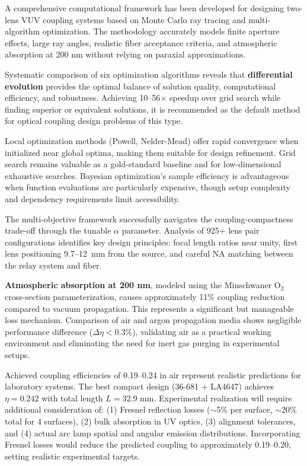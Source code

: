 A comprehensive computational framework has been developed for designing two-lens VUV coupling systems based on Monte Carlo ray tracing and multi-algorithm optimization. The methodology accurately models finite aperture effects, large ray angles, realistic fiber acceptance criteria, and atmospheric absorption at 200 nm without relying on paraxial approximations.

Systematic comparison of six optimization algorithms reveals that \textbf{differential evolution} provides the optimal balance of solution quality, computational efficiency, and robustness. Achieving 10--56$\times$ speedup over grid search while finding superior or equivalent solutions, it is recommended as the default method for optical coupling design problems of this type.

Local optimization methods (Powell, Nelder-Mead) offer rapid convergence when initialized near global optima, making them suitable for design refinement. Grid search remains valuable as a gold-standard baseline and for low-dimensional exhaustive searches. Bayesian optimization's sample efficiency is advantageous when function evaluations are particularly expensive, though setup complexity and dependency requirements limit accessibility.

The multi-objective framework successfully navigates the coupling-compactness trade-off through the tunable $\alpha$ parameter. Analysis of 925+ lens pair configurations identifies key design principles: focal length ratios near unity, first lens positioning 9.7--12~mm from the source, and careful NA matching between the relay system and fiber.

\textbf{Atmospheric absorption at 200 nm}, modeled using the Minschwaner O$_2$ cross-section parameterization, causes approximately 11\% coupling reduction compared to vacuum propagation. This represents a significant but manageable loss mechanism. Comparison of air and argon propagation media shows negligible performance difference ($\Delta\eta < 0.3\%$), validating air as a practical working environment and eliminating the need for inert gas purging in experimental setups.

Achieved coupling efficiencies of 0.19--0.24 in air represent realistic predictions for laboratory systems. The best compact design (36-681 + LA4647) achieves $\eta = 0.242$ with total length $L = 32.9$ mm. Experimental realization will require additional consideration of: (1) Fresnel reflection losses ($\sim$5\% per surface, $\sim$20\% total for 4 surfaces), (2) bulk absorption in UV optics, (3) alignment tolerances, and (4) actual arc lamp spatial and angular emission distributions. Incorporating Fresnel losses would reduce the predicted coupling to approximately 0.19--0.20, setting realistic experimental targets.

